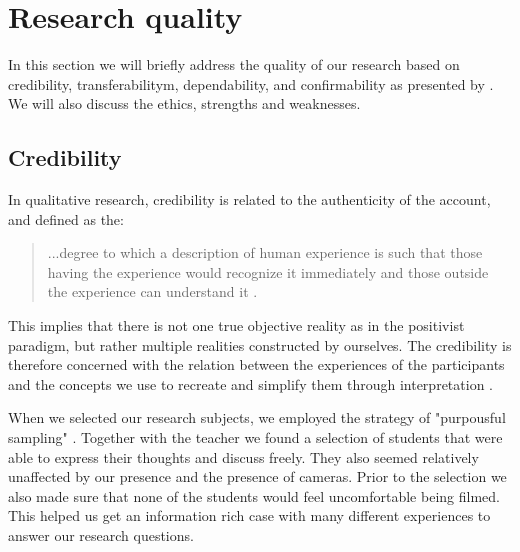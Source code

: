 


\section{Research quality}
In this section we will briefly address the quality of our research based on credibility, transferabilitym, dependability, and confirmability as presented by \citet{baxter1997evaluating}. We will also discuss the ethics, strengths and weaknesses. 

\subsection{Credibility}
In qualitative research, credibility is related to the authenticity of the account, and defined as the: \begin{quote}...degree to which a description of human experience is such that those having the experience would recognize it immediately and those outside the experience can understand it \citetext{\citealp{lincoln1985naturalistic}, referenced in \citealp{baxter1997evaluating}}.\end{quote}

This implies that there is not one true objective reality as in the positivist paradigm, but rather multiple realities constructed by ourselves. The credibility is therefore concerned with the relation between the experiences of the participants and the concepts we use to recreate and simplify them through interpretation \citep{baxter1997evaluating}.

When we selected our research subjects, we employed the strategy of "purpousful sampling" \citep{baxter1997evaluating}. Together with the teacher we found a selection of students that were able to express their thoughts and discuss freely. They also seemed relatively unaffected by our presence and the presence of cameras. Prior to the selection we also made sure that none of the students would feel uncomfortable being filmed. This helped us get an information rich case with many different experiences to answer our research questions. 

